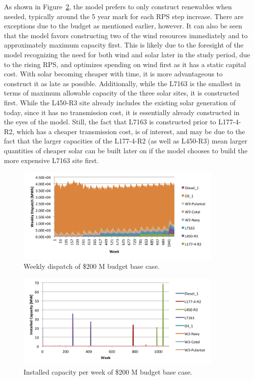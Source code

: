 \documentclass[12pt,letterpaper,fleqn]{article}
\begin{document}
As shown in Figure~\ref{fig:installed}, the model prefers to only
construct renewables when needed, typically around the 5 year mark for
each RPS step increase. There are exceptions due to the budget as
mentioned earlier, however. It can also be seen that the model favors
constructing two of the wind resources immediately and to
approximately maximum capacity first. This is likely due to the
foresight of the model recognizing the need for both wind and solar
later in the study period, due to the rising RPS, and optimizes
spending on wind first as it has a static capital cost. With solar
becoming cheaper with time, it is more advantageous to construct it as
late as possible. Additionally, while the L7163 is the smallest in
terms of maximum allowable capacity of the three solar sites, it is
constructed first. While the L450-R3 site already includes the
existing solar generation of today, since it has no transmission cost,
it is essentially already constructed in the eyes of the model. Still,
the fact that L7163 is constructed prior to L177-4-R2, which has a
cheaper transmission cost, is of interest, and may be due to the fact
that the larger capacities of the L177-4-R2 (as well as L450-R3) mean
larger quantities of cheaper solar can be built later on if the model
chooses to build the more expensive L7163 site first.

\begin{figure}[!h]
  \centering
  \includegraphics[width=0.9\textwidth]{img/dispatch_base_case}
  \caption{Weekly dispatch of \$200 M budget base case.}
  \label{fig:dispatch_base_case}
\end{figure}

\begin{figure}[!h]
  \centering
  \includegraphics[width=0.9\textwidth]{img/installed}
  \caption{Installed capacity per week of \$200 M budget base case.}
  \label{fig:installed}
\end{figure}
\end{document}
